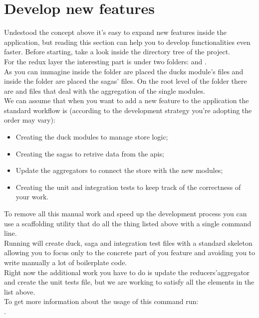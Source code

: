 \documentclass[../redux]{subfiles}
\begin{document}
	\section{Develop new features}
	Undestood the concept above it's easy to expand new features inside the application, but reading this section can help you to develop functionalities even faster.
	Before starting, take a look inside the directory tree of the project. \\
	For the redux layer the interesting part is under two folders:  and .\\
	As you can immagine inside the  folder are placed the ducks module's files and inside the  folder are placed the sagas' files. On the root level of the  folder there are  and  files that deal with the aggregation of the single modules. \\
	We can assume that when you want to add a new feature to the application the standard workflow is (according to the development strategy you're adopting the order may vary):
	\begin{itemize}
		\item Creating the duck modules to manage store logic;
		\item Creating the sagas to retrive data from the apis;
		\item Update the aggregators to connect the store with the new modules;
		\item Creating the unit and integration tests to keep track of the correctness of your work.
	\end{itemize}
	To remove all this manual work and speed up the development process you can use a scaffolding utility that do all the thing listed above with a single command line. \\
	Running  will create duck, saga and integration test files with a standard skeleton allowing you to focus only to the concrete part of you feature and avoiding you to write manually a lot of boilerplate code. \\
	Right now the additional work you have to do is update the reducers'aggregator and create the unit tests file, but we are working to satisfy all the elements in the list above. \\
	To get more information about the usage of this command run: \\ .
	
	
\end{document}
